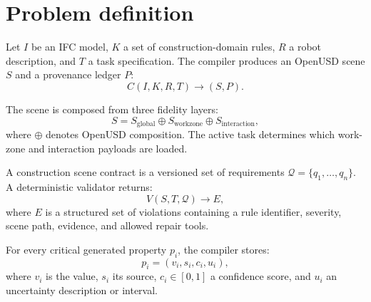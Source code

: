 \section{Problem definition}
\label{sec:problem}

Let \(I\) be an IFC model, \(K\) a set of construction-domain rules, \(R\) a
robot description, and \(T\) a task specification. The compiler produces an
OpenUSD scene \(S\) and a provenance ledger \(P\):
\begin{equation}
  C(I,K,R,T) \rightarrow (S,P).
\end{equation}

The scene is composed from three fidelity layers:
\begin{equation}
  S = S_{\mathrm{global}} \oplus S_{\mathrm{workzone}}
  \oplus S_{\mathrm{interaction}},
\end{equation}
where \(\oplus\) denotes OpenUSD composition. The active task determines which
work-zone and interaction payloads are loaded.

A construction scene contract is a versioned set of requirements
\(\mathcal{Q}=\{q_1,\ldots,q_n\}\). A deterministic validator returns:
\begin{equation}
  V(S,T,\mathcal{Q}) \rightarrow E,
\end{equation}
where \(E\) is a structured set of violations containing a rule identifier,
severity, scene path, evidence, and allowed repair tools.

For every critical generated property \(p_i\), the compiler stores:
\begin{equation}
  p_i = (v_i, s_i, c_i, u_i),
\end{equation}
where \(v_i\) is the value, \(s_i\) its source, \(c_i\in[0,1]\) a confidence
score, and \(u_i\) an uncertainty description or interval.


